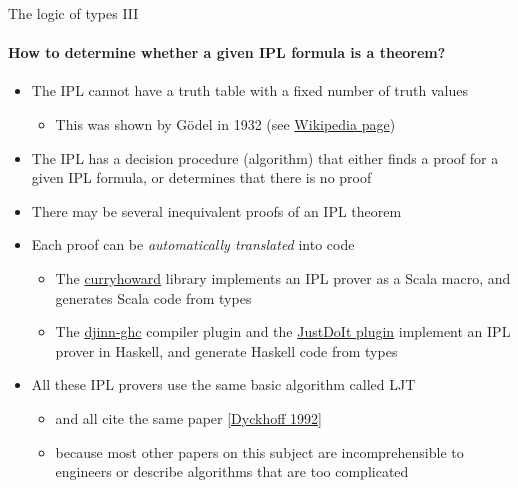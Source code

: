 \documentclass[english]{beamer}
\begin{document}
\begin{frame}{The logic of types III}


\framesubtitle{How to determine whether a given IPL formula is a theorem?}
\begin{itemize}
\item The IPL cannot have a truth table with a fixed number of truth values
\begin{itemize}
\item This was shown by G\"odel in 1932 (see \href{https://en.wikipedia.org/wiki/Many-valued_logic}{Wikipedia page})
\end{itemize}
\item The IPL has a decision procedure (algorithm) that either finds a proof
for a given IPL formula, or determines that there is no proof
\item There may be several inequivalent proofs of an IPL theorem
\item Each proof can be \emph{automatically translated} into code
\begin{itemize}
\item The \href{https://github.com/Chymyst/curryhoward}{curryhoward} library
implements an IPL prover as a Scala macro, and generates Scala code
from types
\item The \href{https://hackage.haskell.org/package/djinn-ghc}{djinn-ghc}
compiler plugin and the \href{https://github.com/nomeata/ghc-justdoit}{JustDoIt plugin}
implement an IPL prover in Haskell, and generate Haskell code from
types
\end{itemize}
\item All these IPL provers use the same basic algorithm called LJT 
\begin{itemize}
\item and all cite the same paper {\footnotesize{}\href{https://rd.host.cs.st-andrews.ac.uk/publications/jsl57.pdf}{[Dyckhoff 1992]}}{\footnotesize \par}
\item because most other papers on this subject are incomprehensible to
engineers or describe algorithms that are too complicated
\end{itemize}
\end{itemize}
\end{frame}
\end{document}
